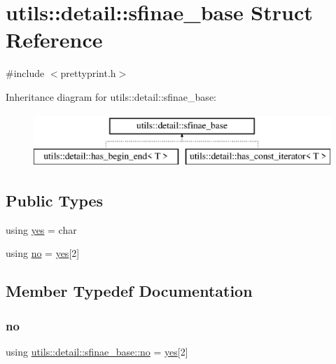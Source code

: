 \hypertarget{structutils_1_1detail_1_1sfinae__base}{}\section{utils\+::detail\+::sfinae\+\_\+base Struct Reference}
\label{structutils_1_1detail_1_1sfinae__base}


{\ttfamily \#include $<$prettyprint.\+h$>$}

Inheritance diagram for utils\+::detail\+::sfinae\+\_\+base\+:\begin{figure}[H]
\begin{center}
\leavevmode
\includegraphics[height=2.000000cm]{da/df2/structutils_1_1detail_1_1sfinae__base}
\end{center}
\end{figure}
\subsection*{Public Types}
\begin{DoxyCompactItemize}
\item 
using \mbox{\hyperlink{structutils_1_1detail_1_1sfinae__base_ad5567f856d8b9af7d1af85c2555ce0e5}{yes}} = char
\item 
using \mbox{\hyperlink{structutils_1_1detail_1_1sfinae__base_acbb41cb70629ed6e94d0763afce7356f}{no}} = \mbox{\hyperlink{structutils_1_1detail_1_1sfinae__base_ad5567f856d8b9af7d1af85c2555ce0e5}{yes}}\mbox{[}2\mbox{]}
\end{DoxyCompactItemize}


\subsection{Member Typedef Documentation}
\mbox{\label{structutils_1_1detail_1_1sfinae__base_acbb41cb70629ed6e94d0763afce7356f}} 
\subsubsection{\texorpdfstring{no}{no}}
{\footnotesize\ttfamily using \mbox{\hyperlink{structutils_1_1detail_1_1sfinae__base_acbb41cb70629ed6e94d0763afce7356f}{utils\+::detail\+::sfinae\+\_\+base\+::no}} =  \mbox{\hyperlink{structutils_1_1detail_1_1sfinae__base_ad5567f856d8b9af7d1af85c2555ce0e5}{yes}}\mbox{[}2\mbox{]}}

